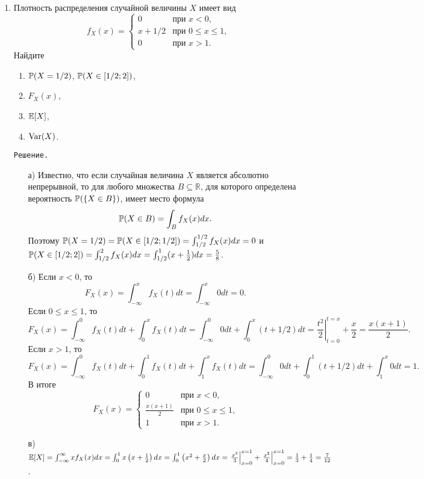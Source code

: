 \begin{enumerate}
\item Плотность распределения случайной величины $X$ имеет вид
\[
f_X(x) =          \begin{cases}
                     0     &   \text{при $x < 0$,} \\
                     x + 1/2   &   \text{при $0 \leq x \leq 1$,} \\
                     0     &   \text{при $x > 1$.}
                  \end{cases}
\]
Найдите
\begin{enumerate}
  \item $\P(X=1/2)$, $\P(X \in [1/2;2])$,
  \item $F_X(x)$,
  \item $\E[X]$,
  \item $\Var(X)$.
\end{enumerate}

\verb"Решение."
\begin{enumerate}
\item[а)] Известно, что если случайная величина $X$ является абсолютно непрерывной, то для любого множества $B \subseteq \mathbb{R}$, для которого определена вероятность $\P(\{X \in B\})$, имеет место формула
\[
\P(X \in B) = \int_{B}f_X(x)dx \text{.}
\]
Поэтому $ \P(X = 1/2) = \P(X \in [1/2;1/2]) = \int_{1/2}^{1/2}f_X(x)dx = 0$ и $\P(X \in [1/2;2]) = \int_{1/2}^{2}f_X(x)dx = \int_{1/2}^{1}(x+\frac{1}{2})dx =\frac{5}{8}$.

\item[б)] Если $x < 0$, то
\[
F_X(x) = \int_{-\infty}^{x}f_X(t)dt = \int_{-\infty}^{x}0dt = 0 \text{.}
\]
Если $0 \leq x \leq 1$, то
\[
F_X(x) = \int_{-\infty}^{0}f_X(t)dt + \int_{0}^{x}f_X(t)dt= \int_{-\infty}^{0}0dt + \int_{0}^{x}(t+1/2)dt = \left.\frac{t^2}{2}\right|_{t=0}^{t=x} + \frac{x}{2} = \frac{x(x+1)}{2} \text{.}
\]
Если $x > 1$, то
\[
F_X(x) = \int_{-\infty}^{0}f_X(t)dt + \int_{0}^{1}f_X(t)dt + \int_{1}^{x}f_X(t)dt = \int_{-\infty}^{0}0dt + \int_{0}^{1}(t+1/2)dt + \int_{1}^{x}0dt = 1 \text{.}
\]
В итоге
\[
F_X(x) =
                 \begin{cases}
                     0                   &   \text{при $x < 0$,} \\
                     \frac{x(x+1)}{2}   &   \text{при $0 \leq x \leq 1$,} \\
                     1                   &   \text{при $x > 1$.}
                  \end{cases}
\]

\item[в)] $\E[X] = \int_{-\infty}^{\infty}xf_X(x)dx = \int_{0}^{1}x\left(x+\frac{1}{2}\right)dx = \int_{0}^{1}\left(x^2+\frac{x}{2}\right)dx = \left.\frac{x^3}{3}\right|_{x=0}^{x=1} + \left.\frac{x^2}{4}\right|_{x=0}^{x=1} = \frac{1}{3} + \frac{1}{4} = \frac{7}{12}$.


\end{enumerate}
\end{enumerate}
